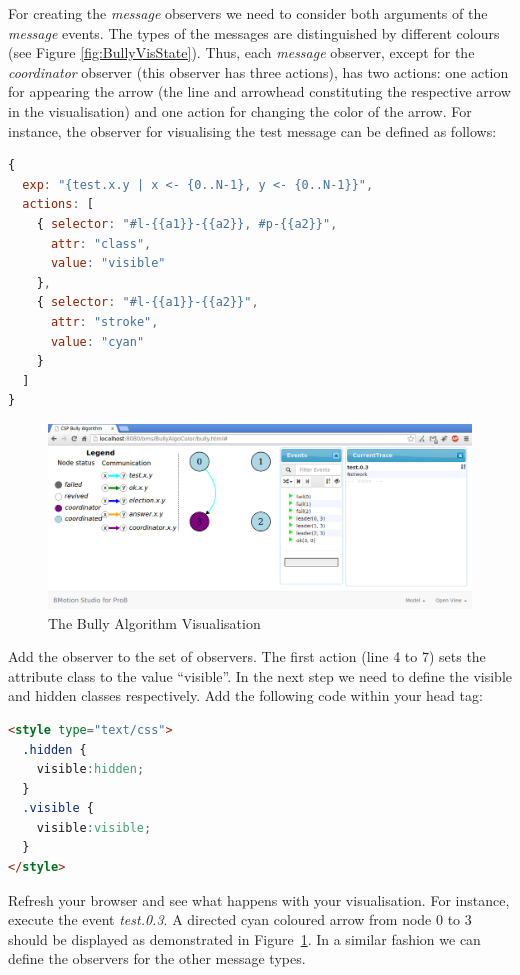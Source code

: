 For creating the \textit{message} observers we need to consider both arguments of the \textit{message} events.
The types of the messages are distinguished by different colours (see Figure \ref{fig:BullyVisState}).
Thus, each \textit{message} observer, except for the \textit{coordinator} observer (this observer has three actions), has two actions: one action for appearing the arrow (the line and arrowhead constituting the respective arrow in the visualisation) and one action for changing the color of the arrow.
For instance, the observer for visualising the test message can be defined as follows:

\begin{lstlisting}[language=JavaScript]
{
  exp: "{test.x.y | x <- {0..N-1}, y <- {0..N-1}}",
  actions: [
    { selector: "#l-{{a1}}-{{a2}}, #p-{{a2}}",
      attr: "class",
      value: "visible"
    },
    { selector: "#l-{{a1}}-{{a2}}",
      attr: "stroke",
      value: "cyan"
    }
  ]
}
\end{lstlisting}

\begin{figure}[h!]\centering
	\includegraphics[width=16cm]{img/tutorial/bully2}
	\caption{The Bully Algorithm Visualisation}
	\label{fig:bully2}
\end{figure}

Add the observer to the set of observers.
The first action (line 4 to 7) sets the attribute class to the value ``visible''.
In the next step we need to define the visible and hidden classes respectively.
Add the following code within your head tag:

\begin{lstlisting}[language=html]
<style type="text/css">
  .hidden {
    visible:hidden;
  }
  .visible {
    visible:visible;
  }
</style>
\end{lstlisting}

Refresh your browser and see what happens with your visualisation.
For instance, execute the event \textit{test.0.3}.
A directed cyan coloured arrow from node 0 to 3 should be displayed as demonstrated in Figure~\ref{fig:bully2}.
In a similar fashion we can define the observers for the other message types. 

